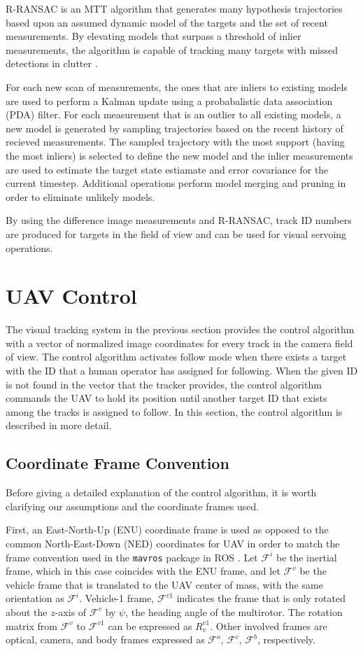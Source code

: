 R-RANSAC is an MTT algorithm that generates many hypothesis trajectories based upon an assumed dynamic model of the targets and the set of recent measurements. By elevating models that surpass a threshold of inlier measurements, the algorithm is capable of tracking many targets with missed detections in clutter \cite{Niedfeldt2014}.

For each new scan of measurements, the ones that are inliers to existing models are used to perform a Kalman update using a probabalistic data association (PDA) filter. For each measurement that is an outlier to all existing models, a new model is generated by sampling trajectories based on the recent history of recieved measurements. The sampled trajectory with the most support (having the most inliers) is selected to define the new model and the inlier measurements are used to estimate the target state estiamate and error covariance for the current timestep. Additional operations perform model merging and pruning in order to eliminate unlikely models.

By using the difference image measurements and R-RANSAC, track ID numbers are produced for targets in the field of view and can be used for visual servoing operations.

\section{UAV Control}
The visual tracking system in the previous section provides the control algorithm with a vector of normalized image coordinates for every track in the camera field of view. The control algorithm activates follow mode when there exists a target with the ID that a human operator has assigned for following. When the given ID is not found in the vector that the tracker provides, the control algorithm commands the UAV to hold its position until another target ID that exists among the tracks is assigned to follow. In this section, the control algorithm is described in more detail.

\subsection{Coordinate Frame Convention}
Before giving a detailed explanation of the control algorithm, it is worth clarifying our assumptions and the coordinate frames used. 

First, an East-North-Up (ENU) coordinate frame is used as opposed to the common North-East-Down (NED) coordinates for UAV in order to match the frame convention used in the \texttt{mavros} package in ROS \cite{mavros}. Let $\mathcal{F}^i$ be the inertial frame, which in this case coincides with the ENU frame, and let $\mathcal{F}^v$ be the vehicle frame that is translated to the UAV center of mass, with the same orientation as $\mathcal{F}^i$. Vehicle-1 frame, $\mathcal{F}^{v1}$ indicates the frame that is only rotated about the $z$-axis of $\mathcal{F}^{v}$ by $\psi$, the heading angle of the multirotor. The rotation matrix from $\mathcal{F}^v$ to $\mathcal{F}^{v1}$ can be expressed as $R^{v1}_v$. Other involved frames are optical, camera, and body frames expressed as $\mathcal{F}^o$, $\mathcal{F}^c$, $\mathcal{F}^b$, respectively. 

